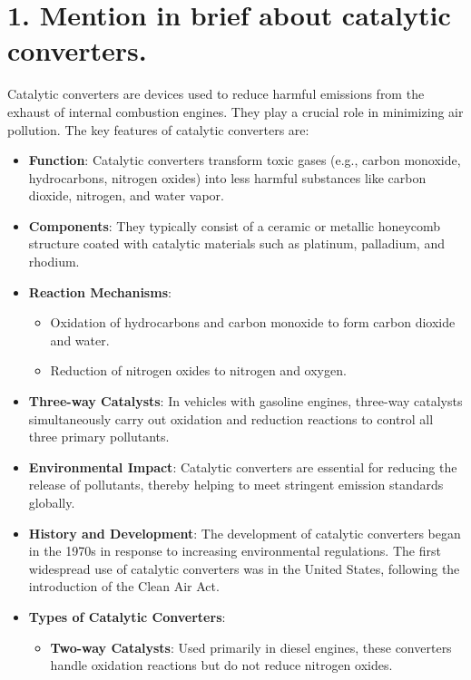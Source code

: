 \documentclass[11pt]{article}
\begin{document}
\tableofcontents
\thispagestyle{empty}
\clearpage

\setcounter{page}{1}

\section{1. Mention in brief about catalytic converters.}
Catalytic converters are devices used to reduce harmful emissions from the exhaust of internal combustion engines. They play a crucial role in minimizing air pollution. The key features of catalytic converters are:
\begin{itemize}
    \item \textbf{Function}: Catalytic converters transform toxic gases (e.g., carbon monoxide, hydrocarbons, nitrogen oxides) into less harmful substances like carbon dioxide, nitrogen, and water vapor.
    \item \textbf{Components}: They typically consist of a ceramic or metallic honeycomb structure coated with catalytic materials such as platinum, palladium, and rhodium.
    \item \textbf{Reaction Mechanisms}:
    \begin{itemize}
        \item Oxidation of hydrocarbons and carbon monoxide to form carbon dioxide and water.
        \item Reduction of nitrogen oxides to nitrogen and oxygen.
    \end{itemize}
    \item \textbf{Three-way Catalysts}: In vehicles with gasoline engines, three-way catalysts simultaneously carry out oxidation and reduction reactions to control all three primary pollutants.
    \item \textbf{Environmental Impact}: Catalytic converters are essential for reducing the release of pollutants, thereby helping to meet stringent emission standards globally.
    \item \textbf{History and Development}: The development of catalytic converters began in the 1970s in response to increasing environmental regulations. The first widespread use of catalytic converters was in the United States, following the introduction of the Clean Air Act.
    \item \textbf{Types of Catalytic Converters}:
    \begin{itemize}
        \item \textbf{Two-way Catalysts}: Used primarily in diesel engines, these converters handle oxidation reactions but do not reduce nitrogen oxides.

\end{itemize}
\end{itemize}
\end{document}
